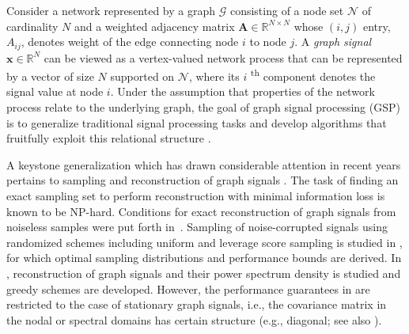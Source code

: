 Consider a network represented by a graph $\mathcal{G}$ consisting of a node set $\mathcal{N}$ of 
cardinality $N$ and a weighted adjacency matrix $\mathbf{A} \in \mathbb{R}^{N \times N}$ whose
$(i,j)$ entry, $A_{ij}$, denotes weight of the edge connecting node $i$ to node $j$.  A \textit{graph 
signal} $\mathbf{x} \in \mathbb{R}^{N}$ can be viewed as a vertex-valued network 
process that can be represented by a vector of size $N$ supported on $\mathcal{N}$, where its $i$
\textsuperscript{th} component denotes the signal value at node $i$. Under the assumption that properties of the network process relate to the underlying graph, the goal of graph signal processing (GSP) is to generalize traditional signal processing tasks and develop algorithms that fruitfully exploit this relational structure \cite{shuman2013,sandryhaila2013}.

A keystone generalization which has drawn considerable attention in recent years pertains to sampling 
and reconstruction of graph signals \cite{shomorony2014sampling,tsitsvero2016signals,anis2016efficient,chen2015discrete,chepuri2016subsampling,marques2016sampling,gama2016rethinking,chamon2017greedy}. The task of finding an exact sampling set to perform reconstruction with minimal information loss is known to be NP-hard.
Conditions for exact reconstruction of graph signals from noiseless samples were put forth in~\cite{shomorony2014sampling,tsitsvero2016signals,anis2016efficient,chen2015discrete}. Sampling of noise-corrupted signals using randomized schemes including uniform and leverage score sampling is studied in \cite{chen2016signal}, for which optimal sampling distributions and
performance bounds are derived.
In \cite{chepuri2016subsampling,chamon2017greedy}, reconstruction of graph signals and their power spectrum density is studied and greedy schemes are developed. However, the performance guarantees 
in \cite{chen2016signal,chamon2017greedy} are restricted to the case of stationary graph signals, i.e., 
the covariance matrix 
in the nodal or spectral domains has certain structure (e.g., diagonal; see also \cite{marques2016stationaryTSP16,perraudinstationary2016,girault_stationarity}). 

